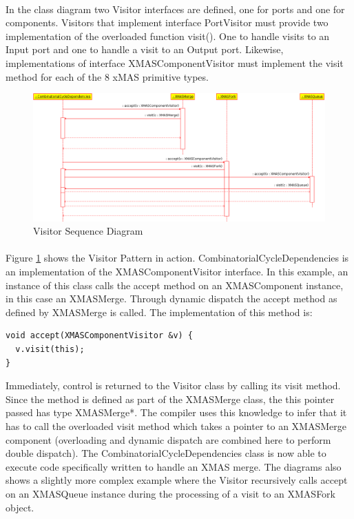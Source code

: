 \documentclass[a4paper,11pt]{article}
\begin{document}
\paragraph{}
In the class diagram two Visitor interfaces are defined, one for ports and one for components.
Visitors that implement interface PortVisitor must provide two implementation of the overloaded
function visit(). One to handle visits to an Input port and one to handle a visit to an Output port.
Likewise, implementations of interface XMASComponentVisitor must implement the visit method
for each of the 8 xMAS primitive types.

\begin{figure}[h]
 \includegraphics[width=\textwidth]{images/visitor-sequence-diagram}
 \caption{Visitor Sequence Diagram}
 \label{fig:visitor-sequence-diagram}
\end{figure}

\paragraph{}
Figure \ref{fig:visitor-sequence-diagram} shows the Visitor Pattern in action.
CombinatorialCycleDependencies is an implementation of the XMASComponentVisitor interface.
In this example, an instance of this class calls the accept method on an XMASComponent
instance, in this case an XMASMerge. Through dynamic dispatch the accept method as
defined by XMASMerge is called. The implementation of this method is:\\
\begin{verbatim}
void accept(XMASComponentVisitor &v) {
  v.visit(this);
}
\end{verbatim}

Immediately, control is returned to the Visitor class by calling its visit method. Since the method
is defined as part of the XMASMerge class, the this pointer passed has type XMASMerge*. The compiler
uses this knowledge to infer that it has to call the overloaded visit method which takes a pointer
to an XMASMerge component (overloading and dynamic dispatch are combined here to perform double
dispatch). The CombinatorialCycleDependencies class is now able to execute code specifically written
to handle an XMAS merge. The diagrams also shows a slightly more complex example where the Visitor
recursively calls accept on an XMASQueue instance during the processing of a visit to an XMASFork object.
\end{document}
